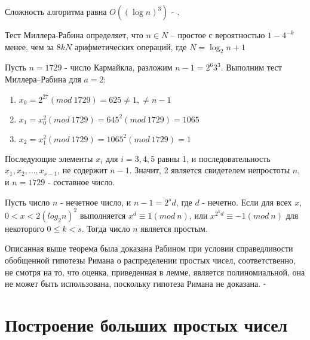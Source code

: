 Сложность алгоритма равна $O((\log{n})^3)$ - \cite[Глава 5.1.3, страница 184]{mah06}.

  \begin{statement}
      Тест Миллера-Рабина определяет, что {$n \in N$} – простое с вероятностью
    {$1 - 4^{ -k}$} менее, чем за {$ 8kN $} арифметических операций, где {$N = \log_{2}{n} + 1 $}
    
  \end{statement}

  \begin{example}    
  
      Пусть {$n = 1729$} - число Кармайкла, разложим {$n - 1 = 2^{ 6} 3^{ 3}$}. 
    Выполним тест Миллера–Рабина для {$a = 2$}:
    
    \begin{enumerate}
      \item {$x_{0} = 2^{ 27} (mod \: 1729) = 625 \ne 1, \ne n - 1$}
      \item {$x_{1} = x_{0}^{2} (mod \: 1729) = 645^{ 2} (mod \: 1729) = 1065$}
      \item {$x_{2} = x_{1}^{2} (mod \: 1729) = 1065^{ 2} (mod \: 1729) = 1$}
    \end{enumerate}
    
    Последующие элементы {${x_{i}}$} для {$i = 3, 4, 5$} равны 1, и последовательность 
  {${x_{1}, x_{2}, \dots, x_{s-1}}$}, 
  не содержит {$n - 1$}. Значит, 2 является свидетелем непростоты {$n$}, и {$n = 1729$} - составное число.
  
  \end{example}

  \begin{lemma} \label{eq:prime-big-rabin-theorem}
    Пусть число $n$ - нечетное число, и $n-1 = 2^{s} d$, где $d$ - нечетно. Если для всех $x$, $0 < x < 2(log_{2}{n})^2$
    выполняется $x^d \equiv 1 (mod \: n)$, или $ x^{2^{ k} d} \equiv -1 (mod \: n)$ для некоторого $0 \le k < s$. Тогда число $n$ является простым.
  \end{lemma}

    Описанная выше теорема была доказана Рабином при условии справедливости обобщенной гипотезы Римана о распределении простых чисел, соответственно, не смотря на то, что
  оценка, приведенная в лемме, является полиномиальной, она не может быть использована, поскольку гипотеза Римана не доказана. - \cite[Глава 1.10, страница 29]{ish11}

\section{Построение больших простых чисел}

